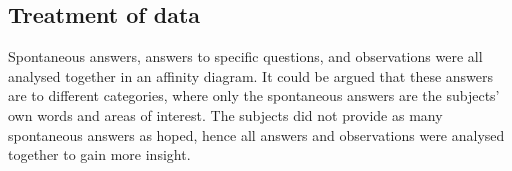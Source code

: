 \subsection{Treatment of data}
Spontaneous answers, answers to specific questions, and observations were all analysed together in an affinity diagram. It could be argued that these answers are to different categories, where only the spontaneous answers are the subjects' own words and areas of interest. The subjects did not provide as many spontaneous answers as hoped, hence all answers and observations were analysed together to gain more insight. 
